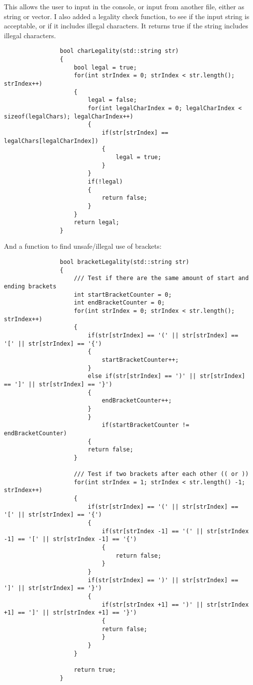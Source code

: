 \documentclass{article}
\begin{document}
			This allows the user to input in the console, or input from another file, either as string or vector.
			I also added a legality check function, to see if the input string is acceptable, or if it includes illegal characters. It returns true if the string includes illegal characters.
			\begin{lstlisting}
				bool charLegality(std::string str)
				{
					bool legal = true;
					for(int strIndex = 0; strIndex < str.length(); strIndex++)
					{
						legal = false;
						for(int legalCharIndex = 0; legalCharIndex < sizeof(legalChars); legalCharIndex++)
						{
							if(str[strIndex] == legalChars[legalCharIndex])
							{
								legal = true;
							}
						}
						if(!legal)
						{
							return false;
						}
					}
					return legal;
				}
			\end{lstlisting}
			
			And a function to find unsafe/illegal use of brackets:
			\begin{lstlisting}
				bool bracketLegality(std::string str)
				{
					/// Test if there are the same amount of start and ending brackets
					int startBracketCounter = 0;
					int endBracketCounter = 0;
					for(int strIndex = 0; strIndex < str.length(); strIndex++)
					{
						if(str[strIndex] == '(' || str[strIndex] == '[' || str[strIndex] == '{')
						{
							startBracketCounter++;
						}
						else if(str[strIndex] == ')' || str[strIndex] == ']' || str[strIndex] == '}')
						{
							endBracketCounter++;
						}
						}
							if(startBracketCounter != endBracketCounter)
						{
						return false;
					}
						
					/// Test if two brackets after each other (( or ))
					for(int strIndex = 1; strIndex < str.length() -1; strIndex++)
					{
						if(str[strIndex] == '(' || str[strIndex] == '[' || str[strIndex] == '{')
						{
							if(str[strIndex -1] == '(' || str[strIndex -1] == '[' || str[strIndex -1] == '{')
							{
								return false;
							}
						}
						if(str[strIndex] == ')' || str[strIndex] == ']' || str[strIndex] == '}')
						{
							if(str[strIndex +1] == ')' || str[strIndex +1] == ']' || str[strIndex +1] == '}')
							{
							return false;
							}
						}
					}
					
					return true;
				}
			\end{lstlisting}
			
\end{document}
